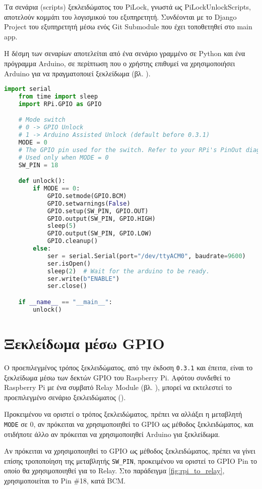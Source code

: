 Τα σενάρια (scripts) ξεκλειδώματος του PiLock, γνωστά ως PiLockUnlockScripts, αποτελούν κομμάτι του λογισμικού του εξυπηρετητή. Συνδέονται με το Django Project του εξυπηρετητή μέσω ενός Git Submodule που έχει τοποθετηθεί στο main app.

Η δέσμη των σεναρίων αποτελείται από ένα σενάριο γραμμένο σε Python και ένα πρόγραμμα Arduino, σε περίπτωση που ο χρήστης επιθυμεί να χρησιμοποιήσει Arduino για να πραγματοποιεί ξεκλείδωμα (βλ. ).

\begin{lstlisting}[language=python, caption=Σενάριο Ξεκλειδώματος Python (unlock.py), label={lst:python_unlockscript}]
	import serial
	from time import sleep
	import RPi.GPIO as GPIO

	# Mode switch
	# 0 -> GPIO Unlock
	# 1 -> Arduino Assisted Unlock (default before 0.3.1)
	MODE = 0
	# The GPIO pin used for the switch. Refer to your RPi's PinOut diagram.
	# Used only when MODE = 0 
	SW_PIN = 18 

	def unlock():
	    if MODE == 0:
	        GPIO.setmode(GPIO.BCM)
	        GPIO.setwarnings(False)
	        GPIO.setup(SW_PIN, GPIO.OUT)
	        GPIO.output(SW_PIN, GPIO.HIGH)
	        sleep(5)
	        GPIO.output(SW_PIN, GPIO.LOW)
	        GPIO.cleanup()
	    else:
	        ser = serial.Serial(port="/dev/ttyACM0", baudrate=9600)
	        ser.isOpen()
	        sleep(2)  # Wait for the arduino to be ready.
	        ser.write(b"ENABLE")
	        ser.close()

	if __name__ == "__main__":
	    unlock()\end{lstlisting}

\section{Ξεκλείδωμα μέσω GPIO}
	Ο προεπιλεγμένος τρόπος ξεκλειδώματος, από την έκδοση \verb|0.3.1| και έπειτα, είναι το ξεκλείδωμα μέσω των δεκτών GPIO του Raspberry Pi. Αφότου συνδεθεί το Raspberry Pi με ένα συμβατό Relay Module (βλ. ), μπορεί να εκτελεστεί το προεπιλεγμένο σενάριο ξεκλειδώματος ().

	Προκειμένου να οριστεί ο τρόπος ξεκλειδώματος, πρέπει να αλλάξει η μεταβλητή \verb|MODE| σε 0, αν πρόκειται να χρησιμοποιηθεί το GPIO ως μέθοδος ξεκλειδώματος, και οτιδήποτε άλλο αν πρόκειται να χρησιμοποιηθεί Arduino για ξεκλείδωμα.

	Αν πρόκειται να χρησιμοποιηθεί το GPIO ως μέθοδος ξεκλειδώματος, πρέπει να γίνει επίσης τροποποίηση της μεταβλητής \verb|SW_PIN|, προκειμένου να οριστεί το GPIO Pin το οποίο θα χρησιμοποιηθεί για το Relay. Στο παράδειγμα \autoref{fig:rpi_to_relay}, χρησιμοποιείται το Pin \#18, κατά BCM.

